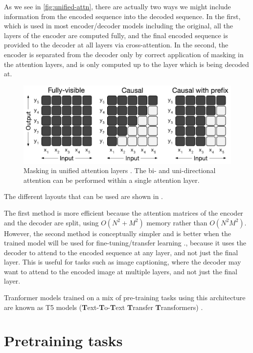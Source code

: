 As we see in \ref{fig:unified-attn}, there are actually two ways we might include information from the encoded sequence into the decoded sequence. In the first, which is used in most encoder/decoder models including the original, all the layers of the encoder are computed fully, and the final encoded sequence is provided to the decoder at all layers via cross-attention. In the second, the encoder is separated from the decoder only by correct application of masking in the attention layers, and is only computed up to the layer which is being decoded at.

\begin{figure}
    \includegraphics[width=\linewidth]{figures/attention_masks.pdf}
    \caption[Attention Masks]{Masking in unified attention layers \cite{unilm,t5}. The bi- and uni-directional attention can be performed within a single attention layer.}
    \label{fig:unified-masking}
\end{figure}

The different layouts that can be used are shown in .

The first method is more efficient because the attention matrices of the encoder and the decoder are split, using $O(N^2 +M^2)$ memory rather than $O(N^2M^2)$. However, the second method is conceptually simpler and is better when the trained model will be used for fine-tuning/transfer learning \cite{t5}., because it uses the  decoder to attend to the encoded sequence at any layer, and not just the final layer. This is useful for tasks such as image captioning, where the decoder may want to attend to the encoded image at multiple layers, and not just the final layer.

Tranformer models trained on a mix of pre-training tasks using this architecture are known as T5 models (\textbf{T}ext-\textbf{T}o-\textbf{T}ext \textbf{T}ransfer \textbf{T}ransformers) \cite{t5}.


\section{Pretraining tasks}
\label{s:pretraining}

